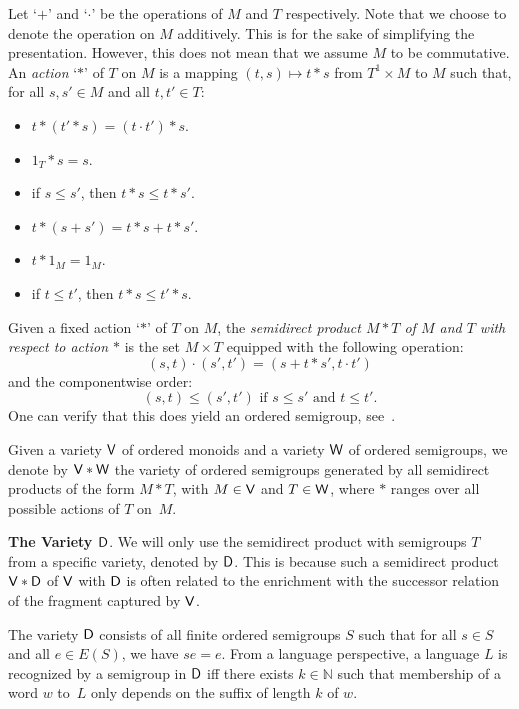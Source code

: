 \documentclass[a4paper,USenglish]{lipics}
\newcommand\nat{\ensuremath{\mathbb{N}}\xspace}
\newcommand\Vbf{\ensuremath{{\sf V}}\xspace}
\newcommand\Wbf{\ensuremath{{\sf W}}\xspace}
\newcommand\Dbf{\ensuremath{{\sf D}}\xspace}
\newcommand\highlight[1]{\par\bigskip\noindent\textbf{\sffamily #1}.}
\theoremstyle{plain}
\begin{document}
Let `$+$' and `$\cdot$' be the operations of $M$ and $T$ respectively. Note
that we choose to denote the operation on $M$ additively. This is for the sake
of simplifying the presentation. However, this does not mean that we assume
$M$ to be commutative. An \emph{action} `$\ast$' of $T$ on $M$ is a mapping
$(t,s) \mapsto t \ast s$ from $T^1 \times M$ to $M$ such that, for all
$s,s' \in M$ and all $t,t' \in T$: \begin{multicols}{2}\ignorespaces
  \begin{itemize}[itemsep=.8mm,topsep=0mm,parsep=0mm,partopsep=0mm]
  \item $t \ast (t' \ast s) = (t \cdot t') \ast s$.
  \item $1_T \ast s = s$.
  \item if $s \leqslant s'$, then $t \ast s \leqslant t \ast s'$.
  \item $t \ast (s + s') = t \ast s + t \ast s'$.
  \item $t \ast 1_M = 1_M$.
  \item if $t \leqslant t'$, then $t \ast s \leqslant t' \ast s$.
  \end{itemize}
\end{multicols}
Given a fixed action `$\ast$' of $T$ on $M$, the \emph{semidirect
  product  $M \ast T$ of $M$ and $T$ with respect to action $\ast$}\/ is the set
$M \times T$ equipped with the following operation:
\[
(s,t) \cdot (s',t') = (s + t \ast s',t \cdot t')
\]
\noindent
and the componentwise order:
\[
(s,t) \leqslant (s',t') \text{ if } s \leqslant s' \text{ and }
t \leqslant t'.
\]
One can verify that this does yield an ordered
semigroup, see~\cite{semidirect-ordered:2002}.

Given a variety \Vbf of ordered monoids and a variety \Wbf of ordered
semigroups, we denote by $\Vbf\ast\Wbf$ the variety of ordered semigroups
generated by all semidirect products of the form $M\ast T$, with $M\in\Vbf$
and $T\in\Wbf$, where $\ast$ ranges over all possible actions of $T$ on~$M$.

\highlight{The Variety \Dbf}
We will only use the semidirect product with semigroups $T$ from a specific
variety, denoted by $\Dbf$. This is because such a semidirect product
$\Vbf\ast\Dbf$ of $\Vbf$ with $\Dbf$ is often related to the enrichment with
the successor relation of the fragment captured by $\Vbf$.

The variety \Dbf consists of all finite ordered semigroups $S$ such that for
all $s \in S$ and all $e \in E(S)$, we have $se = e$. From a language
perspective, a language $L$ is recognized by a semigroup in \Dbf iff there
exists $k \in \nat$ such that membership of a word $w$ to~$L$ only depends on
the suffix of length $k$ of $w$.
\end{document}
